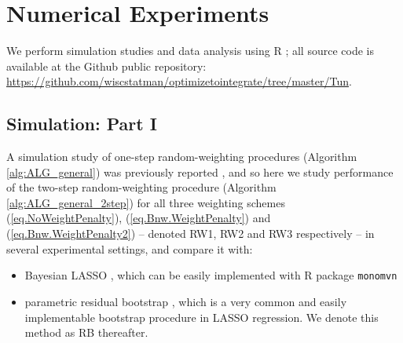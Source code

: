 \documentclass[ejs,authoryear,linksfromyear]{imsart}
\numberwithin{equation}{section}
\theoremstyle{plain}
\begin{document}
\section{Numerical Experiments} \label{sec:numerical}

We perform simulation studies and  data analysis using R  \citep{R};  all source code is available at the Github public repository:  \url{https://github.com/wiscstatman/optimizetointegrate/tree/master/Tun}.  

\subsection{Simulation: Part I}

A simulation study of one-step random-weighting procedures (Algorithm \ref{alg:ALG_general}) was previously reported \citep{WBB}, and so here we study performance of the two-step random-weighting procedure (Algorithm \ref{alg:ALG_general_2step}) for all three weighting schemes (\ref{eq.NoWeightPenalty}), (\ref{eq.Bnw.WeightPenalty}) and (\ref{eq.Bnw.WeightPenalty2}) -- denoted RW1, RW2 and RW3 respectively --  in several experimental settings, and compare it with: 
\begin{itemize}
	\item Bayesian LASSO \citep{BayesianLasso}, which can be easily implemented with R package \texttt{monomvn} \citep{monomvn}
	\item parametric residual bootstrap \citep{Knight&Fu}, which is a very common and easily implementable bootstrap procedure in LASSO regression. We denote this method as RB thereafter.  
\end{itemize}
\end{document}
